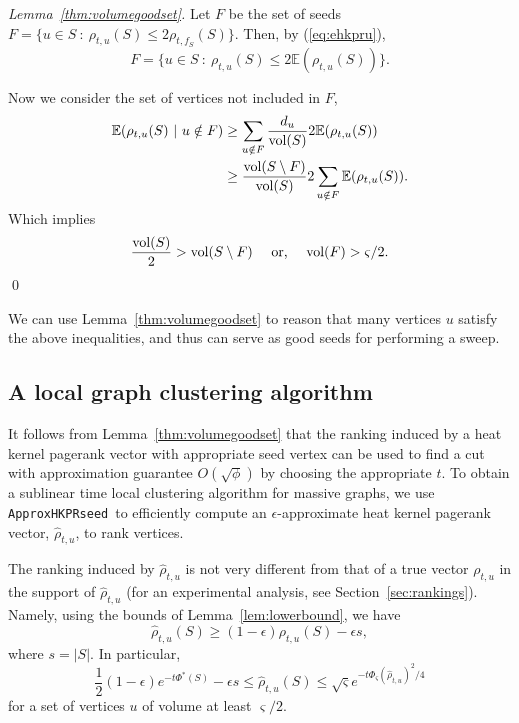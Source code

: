 \documentclass[runningheads,a4paper]{llncs}
\newcommand{\E}{\mathbb{E}}
\newcommand{\vol}{\textmd{vol}}
\newcommand{\localcheeg}{\Phi^*(S)}
\newcommand{\hkprseedalg}{\texttt{ApproxHKPRseed}}
\begin{document}
\begin{proof}[Lemma~\ref{thm:volumegoodset}]
Let $F$ be the set of seeds $F = \{u\in S ~:~ \rho_{t,u}(S) \leq 2\rho_{t,f_S}(S)\}$.
Then, by (\ref{eq:ehkpru}),
\begin{equation*}
F = \{u\in S ~:~ \rho_{t,u}(S) \leq 2\E(\rho_{t,u}(S))\}.
\end{equation*}

Now we consider the set of vertices not included in $F$,
\begin{align*}
\E(\rho_{t,u}(S) ~|~ u\notin F) &\geq \sum\limits_{u\notin F} \frac{d_u}{\vol(S)} 2\E(\rho_{t,u}(S))\\
&\geq \frac{\vol(S\setminus F)}{\vol(S)} 2\sum\limits_{u\notin F} \E(\rho_{t,u}(S)).
\end{align*}
Which implies
\begin{equation*}
\frac{\vol(S)}{2} > \vol(S\setminus F) ~~~\mbox{ or, }~~~ \vol(F) > \varsigma/2.
\end{equation*}
\qed\end{proof}

We can use Lemma~\ref{thm:volumegoodset} to reason that many vertices $u$
satisfy the above inequalities, and thus can serve as good seeds for performing
a sweep.


\subsection{A local graph clustering algorithm}
\label{sec:localpartition}
It follows from Lemma~\ref{thm:volumegoodset} that the ranking induced by a
heat kernel pagerank vector with appropriate seed vertex can be used to find a
cut with approximation guarantee $O(\sqrt{\phi})$ by choosing the appropriate
$t$.  To obtain a sublinear time local clustering algorithm for massive graphs,
we use \hkprseedalg~to efficiently compute an $\epsilon$-approximate heat kernel
pagerank vector, $\hat{\rho}_{t,u}$, to rank vertices.

The ranking induced by $\hat{\rho}_{t,u}$ is not very different from that of a true
vector $\rho_{t,u}$ in the support of $\hat{\rho}_{t,u}$ (for an experimental analysis,
see Section~\ref{sec:rankings}).  Namely, using the bounds of
Lemma~\ref{lem:lowerbound}, we have
\[ \hat{\rho}_{t,u}(S) \geq (1-\epsilon)\rho_{t,u}(S)
-\epsilon s,  \] 
where $s = |S|$.  In particular,
\begin{equation}\label{eq:approxineq}
\frac{1}{2}(1-\epsilon)e^{-t\localcheeg} -\epsilon s 
\leq \hat{\rho}_{t,u}(S) 
\leq \sqrt{\varsigma}e^{-t\Phi_{\varsigma}(\hat{\rho}_{t,u})^2/4}
\end{equation}
for a set of vertices $u$ of volume at least $\varsigma/2$.
\end{document}

